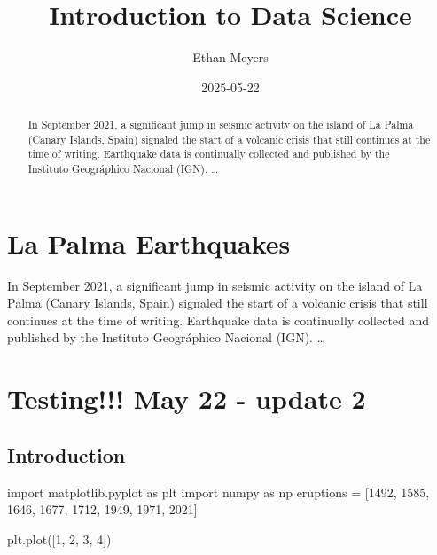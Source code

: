 \documentclass[
  letterpaper,
  DIV=11,
  numbers=noendperiod]{scrreprt}
\title{Introduction to Data Science}
\author{Ethan Meyers}
\date{2025-05-22}
\newenvironment{Shaded}{\begin{snugshade}}{\end{snugshade}}
\newcommand{\DecValTok}[1]{\textcolor[rgb]{0.68,0.00,0.00}{#1}}
\newcommand{\ImportTok}[1]{\textcolor[rgb]{0.00,0.46,0.62}{#1}}
\newcommand{\NormalTok}[1]{\textcolor[rgb]{0.00,0.23,0.31}{#1}}
\newcommand{\OperatorTok}[1]{\textcolor[rgb]{0.37,0.37,0.37}{#1}}
\renewcommand*\contentsname{Table of contents}
\newcommand\contentsname{Table of contents}
\begin{document}
\maketitle
\begin{abstract}
In September 2021, a significant jump in seismic activity on the island
of La Palma (Canary Islands, Spain) signaled the start of a volcanic
crisis that still continues at the time of writing. Earthquake data is
continually collected and published by the Instituto Geográphico
Nacional (IGN). \ldots{}
\end{abstract}

\renewcommand*\contentsname{Table of contents}
{
\hypersetup{linkcolor=}
\setcounter{tocdepth}{2}
\tableofcontents
}


\chapter{La Palma Earthquakes}\label{la-palma-earthquakes}

In September 2021, a significant jump in seismic activity on the island
of La Palma (Canary Islands, Spain) signaled the start of a volcanic
crisis that still continues at the time of writing. Earthquake data is
continually collected and published by the Instituto Geográphico
Nacional (IGN). \ldots{}

\hfill\break


\chapter{Testing!!! May 22 - update 2}\label{testing-may-22---update-2}

\section{Introduction}\label{introduction}

\begin{Shaded}
\begin{Highlighting}[]
\ImportTok{import}\NormalTok{ matplotlib.pyplot }\ImportTok{as}\NormalTok{ plt}
\ImportTok{import}\NormalTok{ numpy }\ImportTok{as}\NormalTok{ np}
\NormalTok{eruptions }\OperatorTok{=}\NormalTok{ [}\DecValTok{1492}\NormalTok{, }\DecValTok{1585}\NormalTok{, }\DecValTok{1646}\NormalTok{, }\DecValTok{1677}\NormalTok{, }\DecValTok{1712}\NormalTok{, }\DecValTok{1949}\NormalTok{, }\DecValTok{1971}\NormalTok{, }\DecValTok{2021}\NormalTok{]}

\NormalTok{plt.plot([}\DecValTok{1}\NormalTok{, }\DecValTok{2}\NormalTok{, }\DecValTok{3}\NormalTok{, }\DecValTok{4}\NormalTok{])}
\end{Highlighting}
\end{Shaded}
\end{document}
